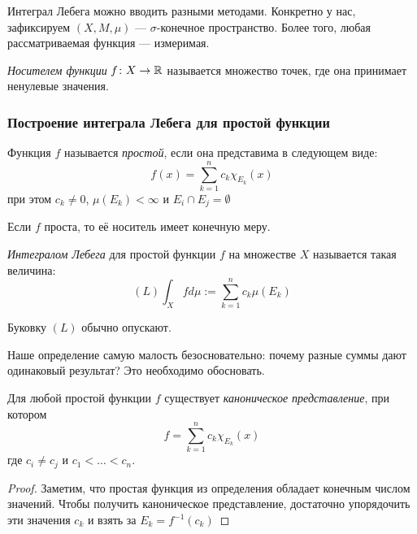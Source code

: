 \begin{note}
	Интеграл Лебега можно вводить разными методами. Конкретно у нас, зафиксируем $(X, M, \mu)$ --- $\sigma$-конечное пространство. Более того, любая рассматриваемая функция --- измеримая.
\end{note}

\begin{definition}
	\textit{Носителем функции} $f \colon X \to \mathbb{R}$ называется множество точек, где она принимает ненулевые значения.
\end{definition}

\subsubsection*{Построение интеграла Лебега для простой функции}

\begin{definition}
	Функция $f$ называется \textit{простой}, если она представима в следующем виде:
	\[
		f(x) = \sum_{k = 1}^n c_k \chi_{E_k} (x)
	\]
	при этом $c_k \neq 0$, $\mu(E_k) < \infty$ и $E_i \cap E_j = \emptyset$
\end{definition}

\begin{note}
	Если $f$ проста, то её носитель имеет конечную меру.
\end{note}

\begin{definition}
	\textit{Интегралом Лебега} для простой функции $f$ на множестве $X$ называется такая величина:
	\[
		(L)\int_X fd\mu := \sum_{k = 1}^n c_k \mu(E_k)
	\]
\end{definition}

\begin{note}
	Буковку $(L)$ обычно опускают.
\end{note}

\begin{note}
	Наше определение самую малость безосновательно: почему разные суммы дают одинаковый результат? Это необходимо обосновать.
\end{note}

\begin{lemma}
	Для любой простой функции $f$ существует \textit{каноническое представление}, при котором
	\[
		f = \sum_{k = 1}^n c_k \chi_{E_k}(x)
	\]
	где $c_i \neq c_j$ и $c_1 < \ldots < c_n$.
\end{lemma}

\begin{proof}
	Заметим, что простая функция из определения обладает конечным числом значений. Чтобы получить каноническое представление, достаточно упорядочить эти значения $c_k$ и взять за $E_k = f^{-1}(c_k)$
\end{proof}

